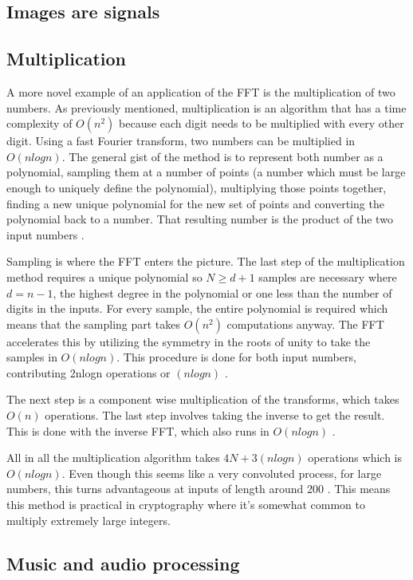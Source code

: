 \subsection{Images are signals}

\subsection{Multiplication}
A more novel example of an application of the FFT is the multiplication of two numbers. As previously mentioned, multiplication is an algorithm that has a time complexity of $O(n^2)$ because each digit needs to be multiplied with every other digit. Using a fast Fourier transform, two numbers can be multiplied in $O(nlogn)$. The general gist of the method is to represent both number as a polynomial, sampling them at a number of points (a number which must be large enough to uniquely define the polynomial), multiplying those points together, finding a new unique polynomial for the new set of points and converting the polynomial back to a number. That resulting number is the product of the two input numbers \cite{Reducible2020}.

Sampling is where the FFT enters the picture. The last step of the multiplication method requires a unique polynomial so $N \geq d+1$ samples are necessary where $d = n-1$, the highest degree in the polynomial or one less than the number of digits in the inputs. For every sample, the entire polynomial is required which means that the sampling part takes $O(n^2)$ computations anyway. The FFT accelerates this by utilizing the symmetry in the roots of unity to take the samples in $O(nlogn)$. This procedure is done for both input numbers, contributing 2nlogn operations or $(nlogn)$ \cite{Reducible2020}.

The next step is a component wise multiplication of the transforms, which takes $O(n)$ operations. The last step involves taking the inverse to get the result. This is done with the inverse FFT, which also runs in $O(nlogn)$ \cite{Reducible2020}.

All in all the multiplication algorithm takes $4N + 3(nlogn)$ operations which is $O(nlogn)$. Even though this seems like a very convoluted process, for large numbers, this turns advantageous at inputs of length around 200 \cite{Emerencia2007}. This means this method is practical in cryptography where it's somewhat common to multiply extremely large integers. 



\subsection{Music and audio processing}